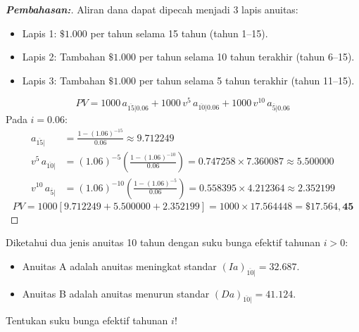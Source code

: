 \documentclass[11pt,a4paper]{article}
\begin{document}
\begin{proof}[\textbf{Pembahasan:}]
Aliran dana dapat dipecah menjadi 3 lapis anuitas:
\begin{itemize}
    \item Lapis 1: $\$1.000$ per tahun selama 15 tahun (tahun 1--15).
    \item Lapis 2: Tambahan $\$1.000$ per tahun selama 10 tahun terakhir (tahun 6--15).
    \item Lapis 3: Tambahan $\$1.000$ per tahun selama 5 tahun terakhir (tahun 11--15).
\end{itemize}
\begin{equation*}
    PV = 1000 \, a_{\overline{15}|0.06} + 1000 \, v^5 \, a_{\overline{10}|0.06} + 1000 \, v^{10} \, a_{\overline{5}|0.06}
\end{equation*}
Pada $i = 0.06$:
\begin{align*}
    a_{\overline{15}|} &= \frac{1 - (1.06)^{-15}}{0.06} \approx 9.712249 \\
    v^5 \, a_{\overline{10}|} &= (1.06)^{-5} \left( \frac{1 - (1.06)^{-10}}{0.06} \right) = 0.747258 \times 7.360087 \approx 5.500000 \\
    v^{10} \, a_{\overline{5}|} &= (1.06)^{-10} \left( \frac{1 - (1.06)^{-5}}{0.06} \right) = 0.558395 \times 4.212364 \approx 2.352199
\end{align*}
\begin{equation*}
    PV = 1000 [ 9.712249 + 5.500000 + 2.352199 ] = 1000 \times 17.564448 = \mathbf{\$17.564,45}
\end{equation*}
\end{proof}

\vspace{1.5em}

\begin{examplebox}
Diketahui dua jenis anuitas 10 tahun dengan suku bunga efektif tahunan $i > 0$:
\begin{itemize}
    \item Anuitas A adalah anuitas meningkat standar $(Ia)_{\overline{10}|} = 32.687$.
    \item Anuitas B adalah anuitas menurun standar $(Da)_{\overline{10}|} = 41.124$.
\end{itemize}
Tentukan suku bunga efektif tahunan $i$!
\end{examplebox}
\end{document}

